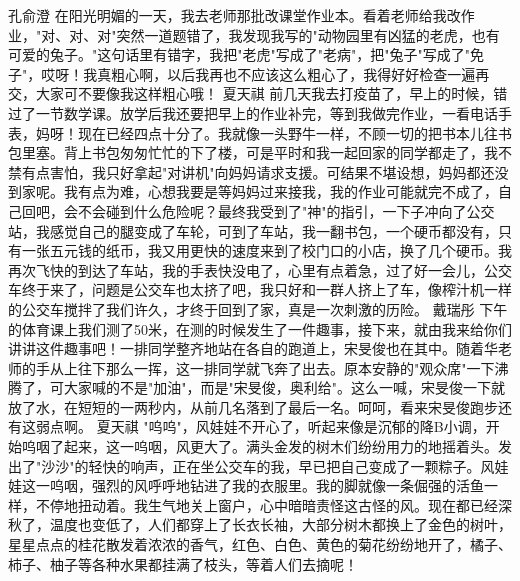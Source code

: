 {}\markdownRendererInterblockSeparator
{}孔俞澄\markdownRendererInterblockSeparator
{}在阳光明媚的一天，我去老师那批改课堂作业本。看着老师给我改作业，"对、对、对"突然一道题错了，我发现我写的"动物园里有凶猛的老虎，也有可爱的兔子。"这句话里有错字，我把"老虎"写成了"老病"，把"兔子"写成了"免子"，哎呀！我真粗心啊，以后我再也不应该这么粗心了，我得好好检查一遍再交，大家可不要像我这样粗心哦！\markdownRendererInterblockSeparator
{}\markdownRendererInterblockSeparator
{}夏天祺\markdownRendererInterblockSeparator
{}前几天我去打疫苗了，早上的时候，错过了一节数学课。放学后我还要把早上的作业补完，等到我做完作业，一看电话手表，妈呀！现在已经四点十分了。我就像一头野牛一样，不顾一切的把书本儿往书包里塞。背上书包匆匆忙忙的下了楼，可是平时和我一起回家的同学都走了，我不禁有点害怕，我只好拿起"对讲机"向妈妈请求支援。可结果不堪设想，妈妈都还没到家呢。我有点为难，心想我要是等妈妈过来接我，我的作业可能就完不成了，自己回吧，会不会碰到什么危险呢？最终我受到了"神"的指引，一下子冲向了公交站，我感觉自己的腿变成了车轮，可到了车站，我一翻书包，一个硬币都没有，只有一张五元钱的纸币，我又用更快的速度来到了校门口的小店，换了几个硬币。我再次飞快的到达了车站，我的手表快没电了，心里有点着急，过了好一会儿，公交车终于来了，问题是公交车也太挤了吧，我只好和一群人挤上了车，像榨汁机一样的公交车搅拌了我们许久，才终于回到了家，真是一次刺激的历险。\markdownRendererInterblockSeparator
{}\markdownRendererInterblockSeparator
{}戴瑞彤\markdownRendererInterblockSeparator
{}下午的体育课上我们测了50米，在测的时候发生了一件趣事，接下来，就由我来给你们讲讲这件趣事吧！一排同学整齐地站在各自的跑道上，宋旻俊也在其中。随着华老师的手从上往下那么一挥，这一排同学就飞奔了出去。原本安静的"观众席"一下沸腾了，可大家喊的不是"加油"，而是"宋旻俊，奥利给"。这么一喊，宋旻俊一下就放了水，在短短的一两秒内，从前几名落到了最后一名。呵呵，看来宋旻俊跑步还有这弱点啊。\markdownRendererInterblockSeparator
{}\markdownRendererInterblockSeparator
{}夏天祺\markdownRendererInterblockSeparator
{}"呜呜"，风娃娃不开心了，听起来像是沉郁的降B小调，开始呜咽了起来，这一呜咽，风更大了。满头金发的树木们纷纷用力的地摇着头。发出了"沙沙"的轻快的响声，正在坐公交车的我，早已把自己变成了一颗粽子。风娃娃这一呜咽，强烈的风呼呼地钻进了我的衣服里。我的脚就像一条倔强的活鱼一样，不停地扭动着。我生气地关上窗户，心中暗暗责怪这古怪的风。现在都已经深秋了，温度也变低了，人们都穿上了长衣长袖，大部分树木都换上了金色的树叶，星星点点的桂花散发着浓浓的香气，红色、白色、黄色的菊花纷纷地开了，橘子、柿子、柚子等各种水果都挂满了枝头，等着人们去摘呢！\markdownRendererInterblockSeparator
